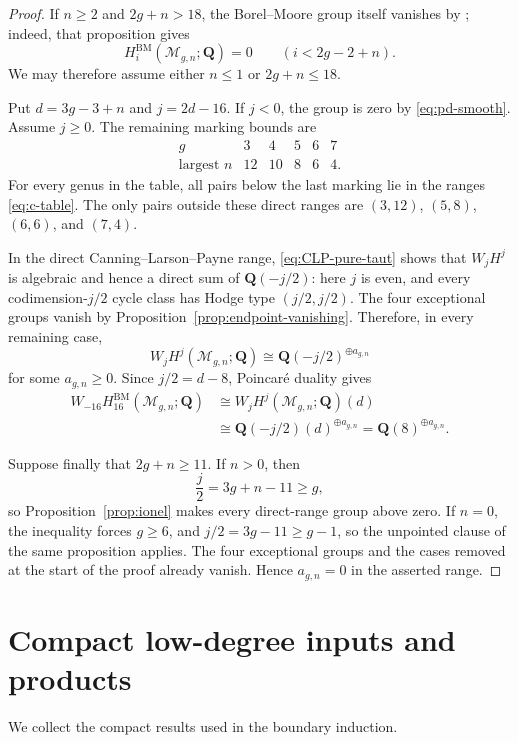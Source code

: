 \documentclass[12pt,reqno]{amsart}
\newcommand{\Q}{\mathbf{Q}}
\newcommand{\M}{\mathcal{M}}
\newcommand{\BM}{\mathrm{BM}}
\theoremstyle{definition}
\theoremstyle{remark}
\begin{document}
\begin{proof}
If $n\geq2$ and $2g+n>18$, the Borel--Moore group itself vanishes by
\cite[Proposition~2.1]{BFP}; indeed, that proposition gives
\[
 H_i^{\BM}(\M_{g,n};\Q)=0\qquad(i<2g-2+n).
\]
We may therefore assume either $n\leq1$ or $2g+n\leq18$.

Put $d=3g-3+n$ and $j=2d-16$.  If $j<0$, the group is zero by
\eqref{eq:pd-smooth}.  Assume $j\geq0$.  The remaining marking bounds are
\[
\begin{array}{c|ccccc}
g&3&4&5&6&7\\ \hline
\text{largest }n&12&10&8&6&4.
\end{array}
\]
For every genus in the table, all pairs below the last marking lie in the
ranges \eqref{eq:c-table}.  The only pairs outside these direct ranges are
$(3,12)$, $(5,8)$, $(6,6)$, and $(7,4)$.

In the direct Canning--Larson--Payne range,
\eqref{eq:CLP-pure-taut} shows that $W_jH^j$ is algebraic and hence a direct
sum of $\Q(-j/2)$: here $j$ is even, and every codimension-$j/2$ cycle class
has Hodge type $(j/2,j/2)$.  The four exceptional groups vanish by
Proposition~\ref{prop:endpoint-vanishing}.  Therefore, in every remaining
case,
\[
 W_jH^j(\M_{g,n};\Q)
 \cong\Q(-j/2)^{\oplus a_{g,n}}
\]
for some $a_{g,n}\geq0$.  Since $j/2=d-8$, Poincar\'e duality gives
\begin{align*}
 W_{-16}H_{16}^{\BM}(\M_{g,n};\Q)
 &\cong W_jH^j(\M_{g,n};\Q)(d)\\
 &\cong\Q(-j/2)(d)^{\oplus a_{g,n}}
  =\Q(8)^{\oplus a_{g,n}}.
\end{align*}

Suppose finally that $2g+n\geq11$.  If $n>0$, then
\[
 \frac j2=3g+n-11\geq g,
\]
so Proposition~\ref{prop:ionel} makes every direct-range group above zero.
If $n=0$, the inequality forces $g\geq6$, and
$j/2=3g-11\geq g-1$, so the unpointed clause of the same proposition
applies.  The four exceptional groups and the cases removed at the start
of the proof already vanish.  Hence $a_{g,n}=0$ in the asserted range.
\end{proof}

\section{Compact low-degree inputs and products}
\label{sec:compact-inputs}

We collect the compact results used in the boundary induction.
\end{document}
